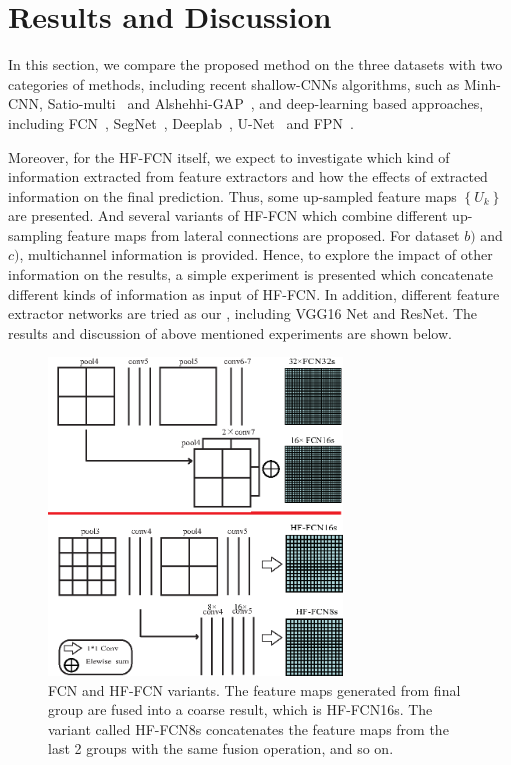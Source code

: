 \section{Results and Discussion}
\label{Sec:Res}

In this section, we compare the proposed method on the three datasets with two categories of methods, including recent shallow-CNNs algorithms, such as Minh-CNN\cite{IEEEexample:mnih2013machine}, Satio-multi~\cite{IEEEexample:saito2016multiple} and Alshehhi-GAP~\cite{IEEEexample:alshehhi2017simultaneous}, and deep-learning based approaches, including FCN~\cite{IEEEexample:Long_2015_CVPR}, SegNet~\cite{IEEEexample:badrinarayanan2017segnet}, Deeplab~\cite{IEEEexample:chen2016deeplab}, U-Net~\cite{IEEEexample:ronneberger2015u} and FPN~\cite{IEEEexample:lin2017feature}.


Moreover, for the HF-FCN itself, we expect to investigate which kind of information extracted from feature extractors and how the effects of extracted information on the final prediction.
Thus, some up-sampled feature maps ${\left\{U_k\right\}}$ are presented.
And several variants of HF-FCN which combine different up-sampling feature maps from lateral connections are proposed.
%
For dataset ${b)}$ and ${c)}$, multichannel information is provided.
Hence, to explore the impact of other information on the results, a simple experiment is presented which concatenate different kinds of information as input of HF-FCN.
In addition, different feature extractor networks are tried as our , including VGG16 Net and ResNet.
The results and discussion of above mentioned experiments are shown below.


\begin{figure}[t]
\centering
\includegraphics[width=7.8cm]{Figures/vairants.eps}
\caption{FCN and HF-FCN variants. The feature maps generated from final group are fused into a coarse result, which is HF-FCN16s.
The variant called HF-FCN8s concatenates the feature maps from the last 2 groups with the same fusion operation, and so on.}
\label{fig:Variants}
\end{figure}

